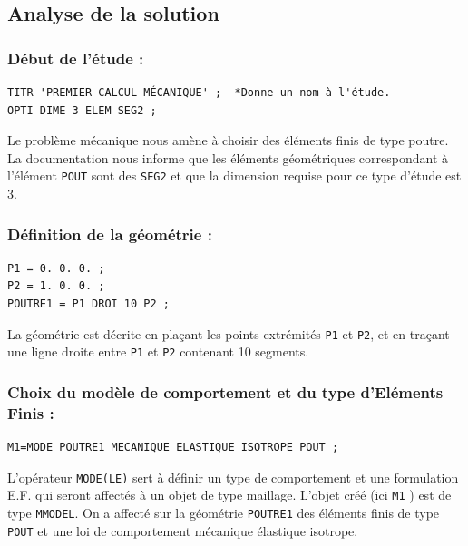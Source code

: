 \documentclass[a4paper,multicol]{article}
\begin{document}
\subsection*{Analyse de la solution}
\subsubsection*{Début de l'étude :}
\begin{verbatim}
TITR 'PREMIER CALCUL MÉCANIQUE' ;  *Donne un nom à l'étude.
OPTI DIME 3 ELEM SEG2 ;
\end{verbatim}
Le problème mécanique nous amène à choisir des éléments finis de type poutre. La documentation nous informe que les éléments géométriques
correspondant à l'élément {\tt POUT} sont des {\tt SEG2} et que la dimension requise pour ce type d'étude est 3.
\subsubsection*{Définition de la géométrie :}
\begin{verbatim}
P1 = 0. 0. 0. ;
P2 = 1. 0. 0. ;
POUTRE1 = P1 DROI 10 P2 ;
\end{verbatim}
La géométrie est décrite en plaçant les points extrémités {\tt P1} et {\tt P2}, et en traçant une ligne droite entre {\tt P1} et {\tt P2} contenant 10 segments.

\subsubsection*{Choix du modèle de comportement et du type d'Eléments Finis :}
\begin{verbatim}
M1=MODE POUTRE1 MECANIQUE ELASTIQUE ISOTROPE POUT ;
\end{verbatim}
L'opérateur {\tt MODE(LE)} sert à définir un type de comportement et une formulation E.F. qui seront affectés à un objet de type maillage. L'objet créé (ici {\tt M1} ) est de type {\tt MMODEL}. On a affecté sur la géométrie {\tt POUTRE1} des éléments finis de type {\tt POUT} et une loi de comportement mécanique élastique isotrope.
\end{document}
